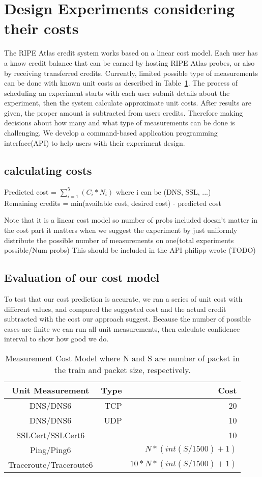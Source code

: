
\section{Design Experiments considering their costs}

The RIPE Atlas credit system works based on a linear cost model. Each user has a know credit balance that can be earned by hosting RIPE Atlas probes, or also by receiving transferred credits. Currently, limited possible type of measurements can be done with known unit costs as described in Table~\ref{tab:cost}. The process of scheduling an experiment starts with each user submit details about the experiment, then the system calculate approximate unit costs. After results are given, the proper amount is subtracted from users credits. Therefore making decisions about how many and what type of measurements can be done is challenging. We develop a command-based application programming interface(API) to help users with their experiment design. 

\subsection{calculating costs}

Predicted cost = $\sum_{i=1}^{5} (C_i * N_i)$  where i can be (DNS, SSL, ...)\\
Remaining credits = min(available cost, desired cost) - predicted cost

Note that it is a linear cost model so number of probs included doesn't matter in the cost part it matters when we suggest the experiment by just uniformly distribute the possible number of measurements on one(total experiments possible/Num probs)
This should be included in the API philipp wrote (TODO)

\subsection{Evaluation of our cost model}
To test that our cost prediction is accurate, we ran a series of unit cost with different values, and compared  the suggested cost and the actual credit subtracted with the cost our approach suggest. Because the number of possible cases are finite we can run all unit measurements, then calculate confidence interval to show how good we do.
\begin{table}[h] 

\hspace{2in}
\centering 
\begin{tabular}{c rr} 
\hline\hline 
Unit Measurement& Type & Cost \\ [0.5ex] 
\hline 
DNS\slash DNS6 & TCP & 20\\ 
DNS\slash DNS6 & UDP & 10\\ 
SSLCert\slash SSLCert6 & & 10 \\
Ping\slash Ping6 & & $N * (int(S/1500)+1)$\\
Traceroute\slash Traceroute6 & & $ 10*N*(int(S/1500)+1)$\\[1ex] 
\hline 
\end{tabular} 
\caption{Measurement Cost Model where N and S are number of packet in the train and packet size, respectively.} 
\label{tab:cost} 
\end{table} 
